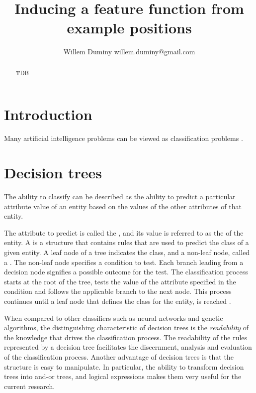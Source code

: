 \documentclass[twoside,11pt]{article}
\begin{document}
\title{Inducing a feature function from example positions}

\author{\name Willem Duminy \email willem.duminy@gmail.com }


\maketitle


\begin{abstract}
TDB
\end{abstract}

\section{Introduction}
Many artificial intelligence problems can be viewed as classification problems \cite{wagacha:trees}.
\section{Decision trees}
\label{sec:decision_tree}   
 The ability to classify can be described as the ability to predict a particular attribute value of an entity based on the values of the other attributes of that entity.  

  The attribute to predict is called the , and its value is referred to as the  of the entity. A  is a structure that contains rules that are used to predict the class of a given entity.  A leaf node of a tree indicates the class, and a non-leaf node, called a . The non-leaf node specifies a condition to test. Each branch leading from a decision node signifies a possible outcome for the test.  The classification process starts at the root of the tree, tests the value of the attribute specified in the condition and follows the applicable branch to the next node. This process continues until a leaf node that defines the class for the entity, is reached \cite{jackson:learning}.

When compared to other classifiers such as neural networks and genetic algorithms, the distinguishing characteristic of decision trees is the {\sl readability} of the knowledge that drives the classification process.  The readability of the rules represented by a decision tree facilitates the discernment, analysis and evaluation of the classification process.  Another advantage of decision trees is that the structure is easy to manipulate.  In particular, the ability to transform decision trees into and-or trees, and logical expressions makes them very useful for the current research.
\end{document}
